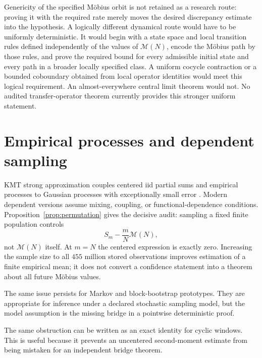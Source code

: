 \documentclass[11pt]{amsart}
\numberwithin{equation}{section}
\theoremstyle{plain}
\theoremstyle{definition}
\theoremstyle{remark}
\newcommand{\Mertens}{\mathcal M}
\begin{document}
Genericity of the specified M\"obius orbit is not retained as a research route:
proving it with the required rate merely moves the desired discrepancy estimate
into the hypothesis.  A logically different dynamical route would have to be
uniformly deterministic.  It would begin with a state space and local transition
rules defined independently of the values of \(\Mertens(N)\), encode the
M\"obius path by those rules, and prove the required bound for every admissible
initial state and every path in a broader locally specified class.  A uniform
cocycle contraction or a bounded coboundary obtained from local operator
identities would meet this logical requirement.  An almost-everywhere central
limit theorem would not.  No audited transfer-operator theorem currently
provides this stronger uniform statement.

\section{Empirical processes and dependent sampling}\label{sec:empirical}

KMT strong approximation couples centered iid partial sums and empirical
processes to Gaussian processes with exceptionally small error
\cite{KMT1975}.  Modern dependent versions assume mixing, coupling, or
functional-dependence conditions.  Proposition~\ref{prop:permutation} gives
the decisive audit: sampling a fixed finite population controls
\begin{equation}\label{eq:empirical-centered}
  S_m-\frac{m}{N}\Mertens(N),
\end{equation}
not \(\Mertens(N)\) itself.  At \(m=N\) the centered expression is exactly
zero.  Increasing the sample size to all \(455\) million stored observations
improves estimation of a finite empirical mean; it does not convert a
confidence statement into a theorem about all future M\"obius values.

The same issue persists for Markov and block-bootstrap prototypes.  They are
appropriate for inference under a declared stochastic sampling model, but the
model assumption is the missing bridge in a pointwise deterministic proof.

The same obstruction can be written as an exact identity for cyclic windows.
This is useful because it prevents an uncentered second-moment estimate from
being mistaken for an independent bridge theorem.
\end{document}

